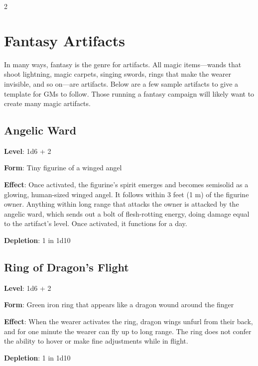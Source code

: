 \begin{multicols}{2}

\chapter{Fantasy Artifacts}

In many ways, fantasy is the genre for artifacts. All magic items—wands that shoot lightning, magic carpets, singing swords, rings that make the wearer invisible, and so on—are artifacts. Below are a few sample artifacts to give a template for GMs to follow. Those running a fantasy campaign will likely want to create many magic artifacts.

\section{Angelic Ward}

\textbf{Level}: 1d6 + 2

\textbf{Form}: Tiny figurine of a winged angel

\textbf{Effect}: Once activated, the figurine’s spirit emerges and becomes semisolid as a glowing, human-sized winged angel. It follows within 3 feet (1 m) of the figurine owner. Anything within long range that attacks the owner is attacked by the angelic ward, which sends out a bolt of flesh-rotting energy, doing damage equal to the artifact’s level. Once activated, it functions for a day.

\textbf{Depletion}: 1 in 1d10

\section{Ring of Dragon's Flight}

\textbf{Level}: 1d6 + 2

\textbf{Form}: Green iron ring that appears like a dragon wound around the finger

\textbf{Effect}: When the wearer activates the ring, dragon wings unfurl from their back, and for one minute the wearer can fly up to long range. The ring does not confer the ability to hover or make fine adjustments while in flight.

\textbf{Depletion}: 1 in 1d10


\end{multicols}
